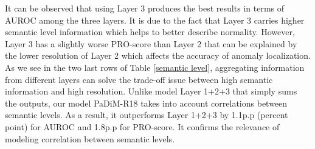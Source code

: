 \documentclass[a4paper,conference]{IEEEtran}
\begin{document}
It can be observed that using Layer 3 produces the best results in terms of AUROC among the three layers. It is due to the fact that Layer 3 carries higher semantic level information which helps to better describe normality. However, Layer 3 has a slightly worse PRO-score than Layer 2 that can be explained by the lower resolution of Layer 2 which affects the accuracy of anomaly localization. As we see in the two last rows of Table \ref{semantic level}, aggregating information from different layers can solve the trade-off issue between high semantic information and high resolution. Unlike model Layer 1+2+3 that simply sums the outputs, our model PaDiM-R18 takes into account correlations between semantic levels. As a result, it outperforms Layer 1+2+3 by 1.1p.p (percent point) for AUROC and 1.8p.p for PRO-score. It confirms the relevance of modeling correlation between semantic levels. \begin{table}[!t]
\caption{Study of the anomaly localization performance using different semantic-level CNN layers. Results are displayed as tuples (AUROC\%, PRO-score\%)  on the MVTec AD.}
\begin{center}

\end{center}


\label{semantic level}
\end{table}
\end{document}
